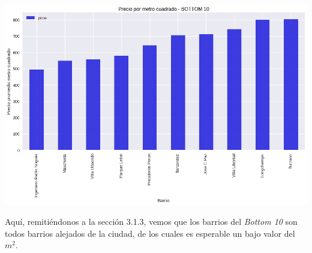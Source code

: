\documentclass[a4paper, 10pt]{article}
\newcommand\tab[1][0.5cm]{\hspace*{#1}}
\begin{document}
				\begin{center}
   	    				\includegraphics[width=\textwidth]{images/m2Bottom10}
			  	\end{center}
				\tab Aquí, remitiéndonos a la sección 3.1.3, vemos que los barrios del \emph{Bottom 10} son todos barrios
				alejados de la ciudad, de los cuales es esperable un bajo valor del $m^2$.
\end{document}
